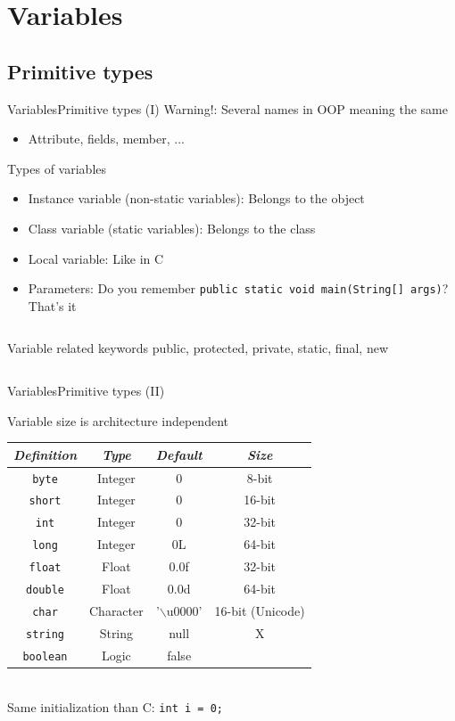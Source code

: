 \documentclass[10pt,compress]{beamer} %
\begin{document}
\section{Variables}
\subsection{Primitive types}
\begin{frame}{Variables}{Primitive types (I)}
	Warning!: Several names in OOP meaning the same
		\begin{itemize}
		    \item Attribute, fields, member, ...
		\end{itemize}
	Types of variables
		\begin{itemize}
			\item Instance variable (non-static variables): Belongs to the object
			\item Class variable (static variables): Belongs to the class
			\item Local variable: Like in C
			\item Parameters: Do you remember \texttt{public static void main(String[] args)}? That's it
		\end{itemize}

    \begin{columns}
			\begin{block}{Variable related keywords}
				public, protected, private, static, final, new
			\end{block}
	\end{columns}
	\bigskip
\end{frame}

\begin{frame}{Variables}{Primitive types (II)}

\centering Variable size is architecture independent
\bigskip
\centering \small{
	\begin{tabular}{cccc} \hline
	\textit{Definition} 	& \textit{Type}		& \textit{Default} 	& \textit{Size} \\\hline
\texttt{byte} 	& Integer	& 0			& 8-bit		\\
\texttt{short} 	& Integer	& 0			& 16-bit 	\\
\texttt{int} 	& Integer	& 0			& 32-bit	\\
\texttt{long} 	& Integer	& 0L		& 64-bit	\\
\texttt{float} 	& Float		& 0.0f		& 32-bit	\\
\texttt{double} & Float		& 0.0d		& 64-bit	\\
\texttt{char} 	& Character	& '$\backslash$u0000'	& 16-bit (Unicode)\\
\texttt{string} & String	& null		& X			\\
\texttt{boolean} & Logic		& false		& 			\\
\hline
\end{tabular}
}
\\
\bigskip
    Same initialization than C: \texttt{int i = 0;}
\end{frame}
\end{document}
